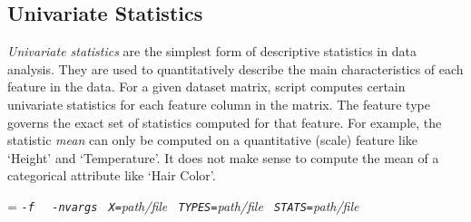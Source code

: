 \begin{comment}

 Licensed to the Apache Software Foundation (ASF) under one
 or more contributor license agreements.  See the NOTICE file
 distributed with this work for additional information
 regarding copyright ownership.  The ASF licenses this file
 to you under the Apache License, Version 2.0 (the
 "License"); you may not use this file except in compliance
 with the License.  You may obtain a copy of the License at

   http://www.apache.org/licenses/LICENSE-2.0

 Unless required by applicable law or agreed to in writing,
 software distributed under the License is distributed on an
 "AS IS" BASIS, WITHOUT WARRANTIES OR CONDITIONS OF ANY
 KIND, either express or implied.  See the License for the
 specific language governing permissions and limitations
 under the License.

\end{comment}

\subsection{Univariate Statistics}

\smallskip

\emph{Univariate statistics} are the simplest form of descriptive statistics in data
analysis.  They are used to quantitatively describe the main characteristics of each
feature in the data.  For a given dataset matrix, script \UnivarScriptName{} computes
certain univariate statistics for each feature column in the
matrix.  The feature type governs the exact set of statistics computed for that feature.
For example, the statistic \emph{mean} can only be computed on a quantitative (scale)
feature like `Height' and `Temperature'.  It does not make sense to compute the mean
of a categorical attribute like `Hair Color'.


\smallskip
{}
\smallskip

{\hangindent=\parindent\noindent\it%
{\tt{}-f } \UnivarScriptName{}
{\tt{} -nvargs}
{\tt{} X=}path/file
{\tt{} TYPES=}path/file
{\tt{} STATS=}path/file

}


